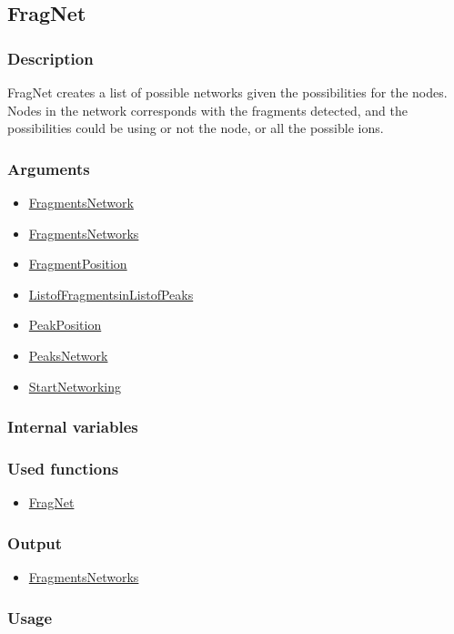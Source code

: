 \subsection{FragNet}\label{FragNet}
\subsubsection{Description}
FragNet creates a list of possible networks given the possibilities for the nodes. Nodes in the network corresponds with the fragments detected, and the possibilities could be using or not the node, or all the possible ions. 
\subsubsection{Arguments}
\begin{itemize}
\item \hyperref[FragmentsNetwork]{FragmentsNetwork} 
\item \hyperref[FragmentsNetworks]{FragmentsNetworks}
\item \hyperref[FragmentPosition]{FragmentPosition}
\item \hyperref[ListofFragmentsinListofPeaks]{ListofFragmentsinListofPeaks}
\item \hyperref[PeakPosition]{PeakPosition}
\item \hyperref[PeaksNetwork]{PeaksNetwork}
\item \hyperref[StartNetworking]{StartNetworking}
\end{itemize}
\subsubsection{Internal variables}
\subsubsection{Used functions}
\begin{itemize}
\item \hyperref[FragNet]{FragNet}
\end{itemize}
\subsubsection{Output}
\begin{itemize}
\item \hyperref[FragmentsNetworks]{FragmentsNetworks}
\end{itemize}
\subsubsection{Usage}



